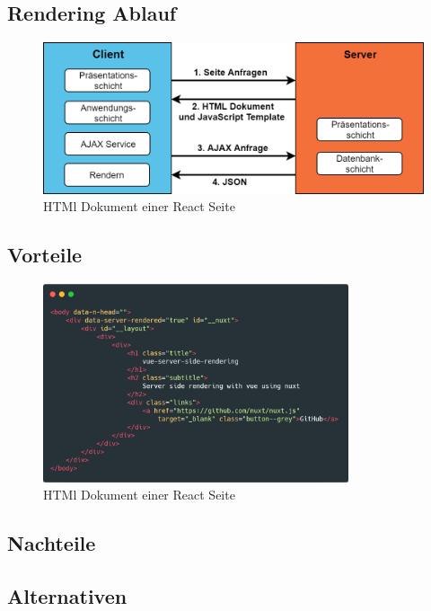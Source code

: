 \documentclass[runningheads]{llncs}
\begin{document}
\subsection{Rendering Ablauf}
\label{subsec:Rendering Ablauf}

\begin{figure}[h]
  \centering
  \includegraphics[width=12cm]{images/universal}
  \caption{HTMl Dokument einer React Seite}
\end{figure}

\newpage
\subsection{Vorteile}
\label{subsec:Vorteile}

\begin{figure}[h]
  \centering
  \includegraphics[width=9cm]{images/nuxt-body-first}
  \caption{HTMl Dokument einer React Seite}
\end{figure}

\subsection{Nachteile}
\label{subsec:Nachteile}

\subsection{Alternativen}
\label{subsec:Alternativen}
\end{document}
